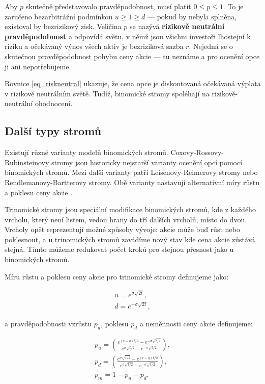 \documentclass[male,czech,api_bc]{kitheses}
\begin{document}
  Aby $p$ skutečně představovalo pravděpodobnost, musí platit $0 \le p \le 1$. To je zaručeno bezarbitrážní podmínkou $u \ge 1 \ge d$ — pokud by nebyla splněna, existoval by bezrizikový zisk. Veličina $p$ se nazývá \textbf{rizikově neutrální pravděpodobnost} 
  a odpovídá světu, v němž jsou všichni investoři lhostejní k riziku a očekávaný výnos všech aktiv je bezriziková sazba $r$. Nejedná se o skutečnou pravděpodobnost pohybu ceny akcie — tu neznáme a pro ocenění opce ji ani nepotřebujeme. 

  Rovnice \eqref{eq_riskneutral} ukazuje, že cena opce je diskontovaná očekávaná výplata v rizikově neutrálním světě. Tudíž, binomické stromy spoléhají na rizikově-neutrální ohodnocení.


 \subsection{Další typy stromů}

 Existují různé varianty modelů binomických stromů. Coxovy-Rossovy-Rubinsteinovy stromy jsou historicky nejstarší varianty ocenění opcí pomocí binomických stromů. Mezi další varianty patří Leisenovy-Reimerovy stromy nebo Rendlemanovy-Bartterovy stromy. Obě varianty nastavují alternativní míry růstu a poklesu ceny akcie \parencites[kapitoly~7.1.3-7.1.4]{Haug2007}.

 Trinomické stromy jsou speciální modifikace binomických stromů, kde z každého vrcholu, který není listem, vedou hrany do tří dalších vrcholů, místo do dvou. Vrcholy opět reprezentují možné způsoby vývoje: akcie může buď růst nebo poklesnout, a u trinomických stromů zavádíme nový stav kde cena akcie zůstává stejná. Tímto můžeme redukovat počet kroků pro stejnou přesnost jako u binomických stromů.

 Míru růstu a poklesu ceny akcie pro trinomické stromy definujeme jako:

 \begin{gather}
   u = e^{\sigma \sqrt{2t}}, \\
   d = e^{-\sigma \sqrt{2t}}, 
 \end{gather}

 a pravděpodobnosti vzrůstu $p_u$, poklesu $p_d$ a neměnnosti ceny akcie definujeme:

 \begin{gather}
   p_u = \left( \frac{e^{(r-q)t/2} - e^{-\sigma \sqrt{t/2}}}{e^{\sigma \sqrt{t/2}} - e^{-\sigma \sqrt{t/2}}}\right), \\
   p_d = \left( \frac{e^{\sigma \sqrt{t/2}} - e^{(r-q)t/2}}{e^{\sigma \sqrt{t/2}} - e^{-\sigma \sqrt{t/2}}}\right), \\
   p_m = 1 - p_u - p_d.
 \end{gather}
\end{document}
